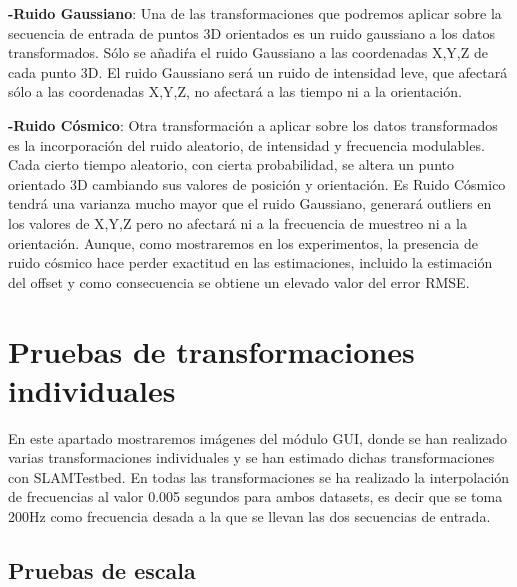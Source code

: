 \textbf{-Ruido Gaussiano}: Una de las transformaciones que podremos aplicar sobre la secuencia de entrada de puntos 3D orientados es un ruido gaussiano a los datos transformados. Sólo se añadiŕa el ruido Gaussiano a las coordenadas X,Y,Z de cada punto 3D.
El ruido Gaussiano será un ruido de intensidad leve, que afectará sólo a las coordenadas X,Y,Z, no afectará a las tiempo ni a la orientación.

\textbf{-Ruido Cósmico}: Otra transformación a aplicar sobre los datos transformados es la incorporación del ruido aleatorio, de intensidad y frecuencia modulables. Cada cierto tiempo aleatorio, con cierta probabilidad, se altera un punto orientado 3D cambiando sus valores de posición y orientación. Es Ruido Cósmico tendrá una varianza mucho mayor que el ruido Gaussiano, generará outliers en los valores de X,Y,Z pero no afectará ni a la frecuencia de muestreo ni a la orientación. Aunque, como mostraremos en los experimentos, la presencia de ruido cósmico hace perder exactitud en las estimaciones, incluido la estimación del offset y como consecuencia se obtiene un elevado valor del error RMSE.


\section{Pruebas de transformaciones individuales}

En este apartado mostraremos imágenes del módulo GUI, donde se han realizado varias transformaciones individuales y se han estimado dichas transformaciones con SLAMTestbed.
En todas las transformaciones se ha realizado la interpolación de frecuencias al valor 0.005 segundos para ambos datasets, es decir que se toma 200Hz como frecuencia desada a la que se llevan las dos secuencias de entrada.

\subsection{Pruebas de escala}

